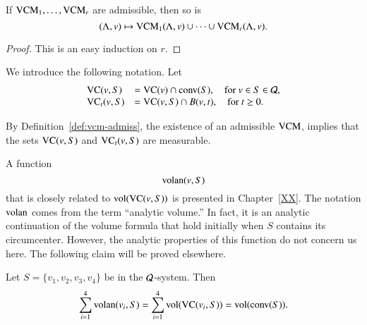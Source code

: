 \begin{lemma} If ${\operatorname{VCM}}_1,\ldots,{\operatorname{VCM}}_r$ are admissible,
then so is $$(\Lambda,v)\mapsto {\operatorname{VCM}}_1(\Lambda,v)\cup\cdots\cup {\operatorname{VCM}}_r(\Lambda,v).$$
\end{lemma}

\begin{proof} This is an easy induction on $r$.
\end{proof}

\begin{definition}[$\op{VC}_t(v,S)$]  We introduce the following notation.  Let
    $$
    \begin{array}{lll}
        {\operatorname{VC}}(v,S) &= {\operatorname{VC}}(v)\cap {\operatorname{conv}}(S),\quad \text{for } v\in
        S\in{\mathcal Q},\\
        {\operatorname{VC}}_t(v,S) &= {\operatorname{VC}}(v,S)\cap B(v,t),\quad\text{for } t\ge
        0.
    \end{array}
    $$
\end{definition}

By Definition~\ref{def:vcm-admiss}, the existence of an admissible
${\operatorname{VCM}}$, implies that the sets ${\operatorname{VC}}(v,S)$ and
$\op{VC}_t(v,S)$ are measurable.  



A function
    $$
    {\operatorname{volan}}(v,S)
    $$ that is closely related to ${\operatorname{vol}}({\operatorname{VC}}(v,S))$ is presented in
Chapter~\ref{XX}.  The notation ${\operatorname{volan}}$
comes from the term ``analytic volume.''  In fact, it is an
analytic continuation of the volume formula that hold initially
when $S$ contains its circumcenter.  However, the analytic
properties of this function do not concern us here.  The following
claim will be proved elsewhere.

\begin{claim}\label{claim:volan} Let $S=\{v_1,v_2,v_3,v_4\}$ be in
the ${\mathcal Q}$-system. Then
    $$
    \sum_{i=1}^4 {\operatorname{volan}}(v_i,S) = \sum_{i=1}^4
    {\operatorname{vol}}({\operatorname{VC}}(v_i,S)) = {\operatorname{vol}}({\operatorname{conv}}(S)).
    $$
\end{claim}



